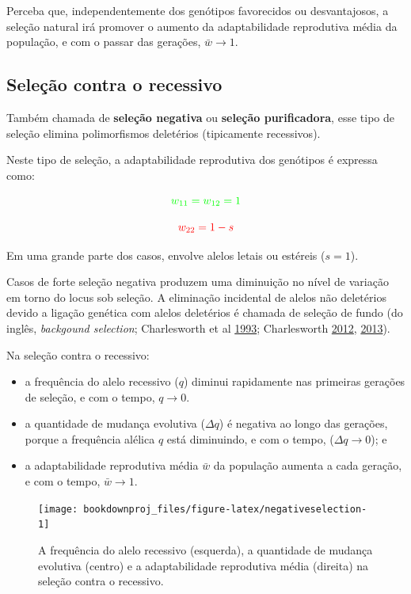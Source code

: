 \documentclass[
]{book}
\begin{document}
Perceba que, independentemente dos genótipos favorecidos ou desvantajosos, a seleção natural irá promover o aumento da adaptabilidade reprodutiva média da população, e com o passar das gerações, \(\bar{w} \to 1\).

\hypertarget{seleuxe7uxe3o-contra-o-recessivo}{%
\subsection{Seleção contra o recessivo}\label{seleuxe7uxe3o-contra-o-recessivo}}

Também chamada de \textbf{seleção negativa} ou \textbf{seleção purificadora}, esse tipo de seleção elimina
polimorfismos deletérios (tipicamente recessivos).

Neste tipo de seleção, a adaptabilidade reprodutiva dos genótipos é expressa como:

\[ \color{green}{w_{11} = w_{12} = 1}\]

\[ \color{red}{w_{22} = 1-s}\]

Em uma grande parte dos casos, envolve alelos letais ou estéreis (\(s=1\)).

Casos de forte seleção negativa produzem uma diminuição no nível de variação em torno do locus sob seleção. A eliminação incidental de alelos não deletérios devido a ligação genética com alelos deletérios é chamada
de seleção de fundo (do inglês, \emph{backgound selection}; Charlesworth et al \href{https://doi.org/10.1093/genetics/134.4.1289}{1993}; Charlesworth \href{https://doi.org/10.1534/genetics.111.134288}{2012}, \href{https://doi.org/10.1093/jhered/ess136}{2013}).

Na seleção contra o recessivo:

\begin{itemize}
\item
  a frequência do alelo recessivo (\(q\)) diminui rapidamente nas primeiras gerações de seleção, e com o tempo, \(q \to 0\).
\item
  a quantidade de mudança evolutiva (\(\Delta q\)) é negativa ao longo das gerações, porque a frequência alélica \(q\) está diminuindo, e com o tempo, (\(\Delta q \to 0\)); e
\item
  a adaptabilidade reprodutiva média \(\bar{w}\) da população aumenta a cada geração, e com o tempo, \(\bar{w} \to 1\).
\end{itemize}

\begin{figure}

{\centering \texttt{[image: bookdownproj\_files/figure-latex/negativeselection-1]} 

}

\caption{A frequência  do alelo recessivo (esquerda), a quantidade de mudança evolutiva (centro) e a adaptabilidade reprodutiva média (direita) na seleção contra o recessivo.}\label{fig:negativeselection}
\end{figure}
\end{document}
